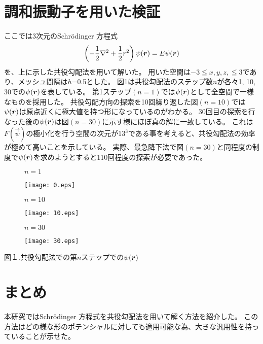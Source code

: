 \documentclass[a4j,twocolumn]{jarticle}
\begin{document}
\section{調和振動子を用いた検証}
ここでは3次元のSchr\"odinger  方程式
\begin{displaymath}
\left(-\frac{1}{2}\nabla^2 + \frac{1}{2}r^2
\right)\psi(\mbox{\boldmath{$r$}}) = E\psi(\mbox{\boldmath{$r$}})
\end{displaymath}
を、上に示した共役勾配法を用いて解いた。
用いた空間は$-3 \leqq x, y, z, \leqq 3$であり、メッシュ間隔は$h$=0.5とした。
図1は共役勾配法のステップ数$n$が各々1, 10, 30での$\psi(\mbox{\boldmath{$r$}})$を表している。
第1ステップ$(n=1)$では$\psi(\mbox{\boldmath{$r$}})$として全空間で一様なものを採用した。
共役勾配方向の探索を10回繰り返した図$(n=10)$では$\psi(\mbox{\boldmath{$r$}})$は原点近くに極大値を持つ形になっているのがわかる。
30回目の探索を行なった後の$\psi(\mbox{\boldmath{$r$}})$は図$(n=30)$に示す様にほぼ真の解に一致している。
これは$F(\vec{\psi})$の極小化を行う空間の次元が$13^3$である事を考えると、共役勾配法の効率が極めて高いことを示している。
実際、最急降下法で図$(n=30)$と同程度の制度で$\psi(\mbox{\boldmath{$r$}})$を求めようとすると110回程度の探索が必要であった。
\begin{figure}[h]
$n=1$
\vspace{-3mm}
\begin{center}
\texttt{[image: 0.eps]}
\end{center}
\end{figure}
\vspace{-7mm}
\begin{figure}[h]
$n=10$
\vspace{-3mm}
\begin{center}
\texttt{[image: 10.eps]}
\end{center}
\end{figure}
\vspace{-7mm}
\begin{figure}[h]
$n=30$
\vspace{-3mm}
\begin{center}
\texttt{[image: 30.eps]}
\end{center}
\end{figure}

図１.共役勾配法での第$n$ステップでの$\psi(\mbox{\boldmath{$r$}})$

\vspace{-7mm}
\section{まとめ}
本研究ではSchr\"odinger  方程式を共役勾配法を用いて解く方法を紹介した。
この方法はどの様な形のポテンシャルに対しても適用可能な為、大きな汎用性を持っていることが示せた。
\end{document}
